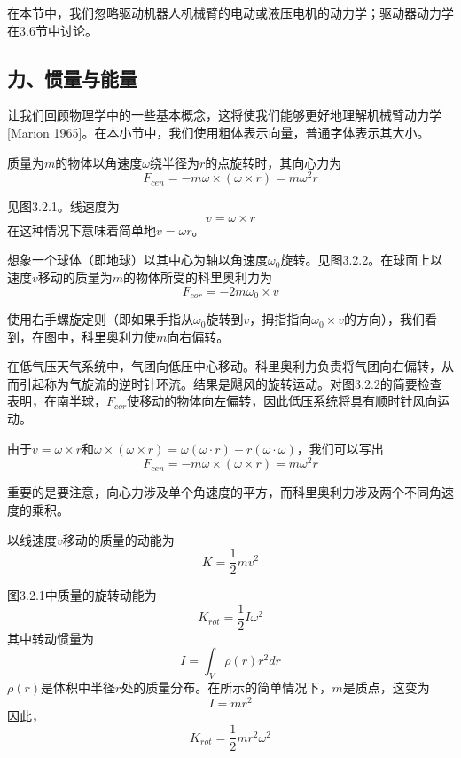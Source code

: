 \documentclass[12pt,a4paper]{ctexart}
\begin{document}
在本节中，我们忽略驱动机器人机械臂的电动或液压电机的动力学；驱动器动力学在3.6节中讨论。

\subsection{力、惯量与能量}

让我们回顾物理学中的一些基本概念，这将使我们能够更好地理解机械臂动力学[Marion 1965]。在本小节中，我们使用粗体表示向量，普通字体表示其大小。

质量为$m$的物体以角速度$\omega$绕半径为$r$的点旋转时，其向心力为
\begin{equation}
F_{cen} = -m\omega \times (\omega \times r) = m\omega^2 r
\end{equation}

见图3.2.1。线速度为
\begin{equation}
v = \omega \times r
\end{equation}
在这种情况下意味着简单地$v = \omega r$。

想象一个球体（即地球）以其中心为轴以角速度$\omega_0$旋转。见图3.2.2。在球面上以速度$v$移动的质量为$m$的物体所受的科里奥利力为
\begin{equation}
F_{cor} = -2m\omega_0 \times v
\end{equation}

使用右手螺旋定则（即如果手指从$\omega_0$旋转到$v$，拇指指向$\omega_0 \times v$的方向），我们看到，在图中，科里奥利力使$m$向右偏转。

在低气压天气系统中，气团向低压中心移动。科里奥利力负责将气团向右偏转，从而引起称为气旋流的逆时针环流。结果是飓风的旋转运动。对图3.2.2的简要检查表明，在南半球，$F_{cor}$使移动的物体向左偏转，因此低压系统将具有顺时针风向运动。

由于$v = \omega \times r$和$\omega \times (\omega \times r) = \omega(\omega \cdot r) - r(\omega \cdot \omega)$，我们可以写出
\begin{equation}
F_{cen} = -m\omega \times (\omega \times r) = m\omega^2 r
\end{equation}

重要的是要注意，向心力涉及单个角速度的平方，而科里奥利力涉及两个不同角速度的乘积。

以线速度$v$移动的质量的动能为
\begin{equation}
K = \frac{1}{2}mv^2
\end{equation}

图3.2.1中质量的旋转动能为
\begin{equation}
K_{rot} = \frac{1}{2}I\omega^2
\end{equation}
其中转动惯量为
\begin{equation}
I = \int_V \rho(r)r^2 dr
\end{equation}
$\rho(r)$是体积中半径$r$处的质量分布。在所示的简单情况下，$m$是质点，这变为
\begin{equation}
I = mr^2
\end{equation}
因此，
\begin{equation}
K_{rot} = \frac{1}{2}mr^2\omega^2
\end{equation}
\end{document}
